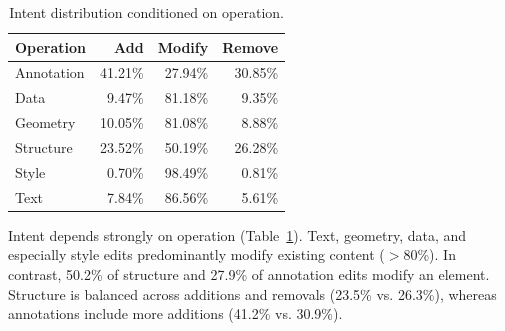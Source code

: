 \begin{table}[t]
\centering
\caption{Intent distribution conditioned on operation.}
\label{tab:daeditikz_intent_given_operation}
\setlength{\tabcolsep}{9pt}
\renewcommand{\arraystretch}{0.98}
\begin{tabular}{lrrr}
\toprule
\textbf{Operation} & \textbf{Add} & \textbf{Modify} & \textbf{Remove} \\
\midrule
Annotation & 41.21\% & 27.94\% & 30.85\% \\
Data       &  9.47\% & 81.18\% &  9.35\% \\
Geometry   & 10.05\% & 81.08\% &  8.88\% \\
Structure  & 23.52\% & 50.19\% & 26.28\% \\
Style      &  0.70\% & 98.49\% &  0.81\% \\
Text       &  7.84\% & 86.56\% &  5.61\% \\
\bottomrule
\end{tabular}
\end{table}
Intent depends strongly on operation (Table~\ref{tab:daeditikz_intent_given_operation}). Text, geometry, data, and especially style edits predominantly modify existing content ($>$80\%). In contrast, 50.2\% of structure and 27.9\% of annotation edits modify an element. Structure is balanced across additions and removals (23.5\% vs. 26.3\%), whereas annotations include more additions (41.2\% vs. 30.9\%).

\clearpage

